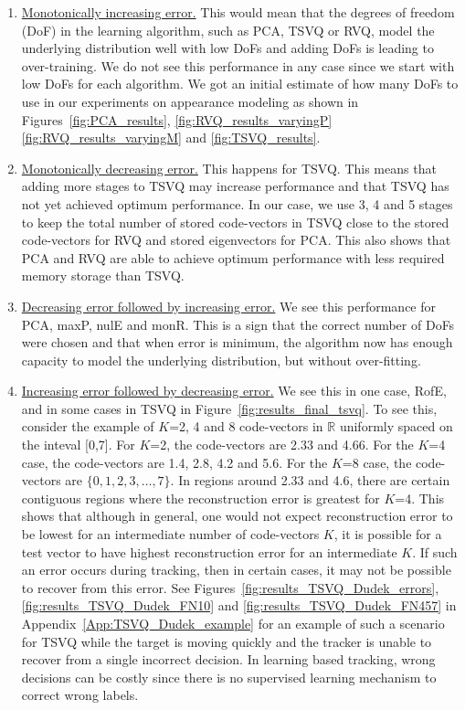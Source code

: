 \begin{enumerate}
\item \underline{Monotonically increasing error.}  This would mean that the degrees of freedom (DoF) in the learning algorithm, such as PCA, TSVQ or RVQ, model the underlying distribution well with low DoFs and adding DoFs is leading to over-training.  We do not see this performance in any case since we start with low DoFs for each algorithm.  We got an initial estimate of how many DoFs to use in our experiments on appearance modeling as shown in Figures~\ref{fig:PCA_results}, \ref{fig:RVQ_results_varyingP} \ref{fig:RVQ_results_varyingM} and \ref{fig:TSVQ_results}.
\item \underline{Monotonically decreasing error.}  This happens for TSVQ.  This means that adding more stages to TSVQ may increase performance and that TSVQ has not yet achieved optimum performance.  In our case, we use 3, 4 and 5 stages to keep the total number of stored code-vectors in TSVQ close to the stored code-vectors for RVQ and stored eigenvectors for PCA.  This also shows that PCA and RVQ are able to achieve optimum performance with less required memory storage than TSVQ.
\item \underline{Decreasing error followed by increasing error.}  We see this performance for PCA, maxP, nulE and monR.  This is a sign that the correct number of DoFs were chosen and that when error is minimum, the algorithm now has enough capacity to model the underlying distribution, but without over-fitting.
\item \underline{Increasing error followed by decreasing error.}  We see this in one case, RofE, and in some cases in TSVQ in Figure~\ref{fig:results_final_tsvq}.  To see this, consider the example of $K$=2, 4 and 8 code-vectors in $\mathbb{R}$ uniformly spaced on the inteval [0,7].  For $K$=2, the code-vectors are 2.33 and 4.66.  For the $K$=4 case, the code-vectors are 1.4, 2.8, 4.2 and 5.6.  For the $K$=8 case, the code-vectors are $\{0, 1, 2, 3, \ldots, 7\}$.  In regions around 2.33 and 4.6, there are certain contiguous regions where the reconstruction error is greatest for $K$=4.  This shows that although in general, one would not expect reconstruction error to be lowest for an intermediate number of code-vectors $K$, it is possible for a test vector to have highest reconstruction error for an intermediate $K$.  If such an error occurs during tracking, then in certain cases, it may not be possible to recover from this error.  See Figures~\ref{fig:results_TSVQ_Dudek_errors}, \ref{fig:results_TSVQ_Dudek_FN10} and \ref{fig:results_TSVQ_Dudek_FN457} in Appendix~\ref{App:TSVQ_Dudek_example} for an example of such a scenario for TSVQ while the target is moving quickly and the tracker is unable to recover from a single incorrect decision.  In learning based tracking, wrong decisions can be costly since there is no supervised learning mechanism to correct wrong labels.
\end{enumerate}

